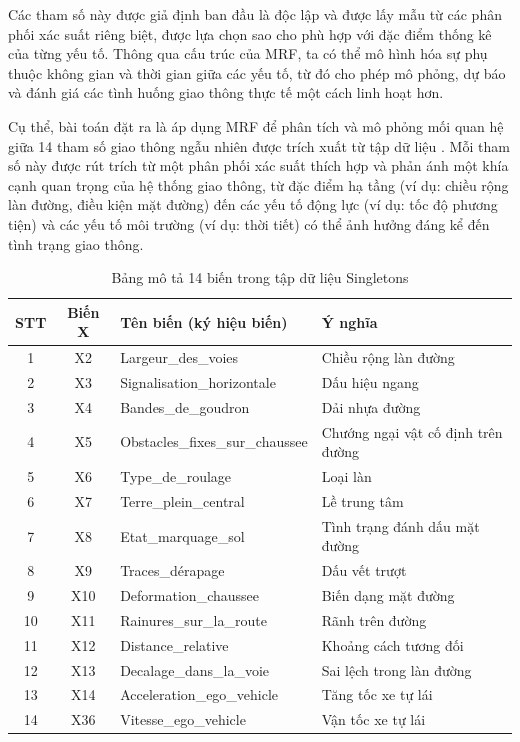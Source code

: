 Các tham số này được giả định ban đầu là độc lập và được lấy mẫu từ các phân phối xác suất riêng biệt, được lựa chọn sao cho phù hợp với đặc điểm thống kê của từng yếu tố. Thông qua cấu trúc của MRF, ta có thể mô hình hóa sự phụ thuộc không gian và thời gian giữa các yếu tố, từ đó cho phép mô phỏng, dự báo và đánh giá các tình huống giao thông thực tế một cách linh hoạt hơn.

Cụ thể, bài toán đặt ra là áp dụng MRF để phân tích và mô phỏng mối quan hệ giữa 14 tham số giao thông ngẫu nhiên được trích xuất từ tập dữ liệu . Mỗi tham số này được rút trích từ một phân phối xác suất thích hợp và phản ánh một khía cạnh quan trọng của hệ thống giao thông, từ đặc điểm hạ tầng (ví dụ: chiều rộng làn đường, điều kiện mặt đường) đến các yếu tố động lực (ví dụ: tốc độ phương tiện) và các yếu tố môi trường (ví dụ: thời tiết) có thể ảnh hưởng đáng kể đến tình trạng giao thông.
\begin{table}[h!]
\centering
\begin{tabular}{|c|c|l|l|}
\hline
\textbf{STT} & \textbf{Biến X} & \textbf{Tên biến (ký hiệu biến)} & \textbf{Ý nghĩa} \\ \hline
1 & X2  & Largeur\_des\_voies              & Chiều rộng làn đường \\ \hline
2 & X3  & Signalisation\_horizontale       & Dấu hiệu ngang \\ \hline
3 & X4  & Bandes\_de\_goudron              & Dải nhựa đường \\ \hline
4 & X5  & Obstacles\_fixes\_sur\_chaussee  & Chướng ngại vật cố định trên đường \\ \hline
5 & X6  & Type\_de\_roulage                & Loại làn \\ \hline
6 & X7  & Terre\_plein\_central            & Lề trung tâm \\ \hline
7 & X8  & Etat\_marquage\_sol              & Tình trạng đánh dấu mặt đường \\ \hline
8 & X9  & Traces\_dérapage                 & Dấu vết trượt \\ \hline
9 & X10 & Deformation\_chaussee            & Biến dạng mặt đường \\ \hline
10 & X11 & Rainures\_sur\_la\_route        & Rãnh trên đường \\ \hline
11 & X12 & Distance\_relative              & Khoảng cách tương đối \\ \hline
12 & X13 & Decalage\_dans\_la\_voie        & Sai lệch trong làn đường \\ \hline
13 & X14 & Acceleration\_ego\_vehicle      & Tăng tốc xe tự lái \\ \hline
14 & X36 & Vitesse\_ego\_vehicle           & Vận tốc xe tự lái \\ \hline
\end{tabular}
\caption{Bảng mô tả 14 biến trong tập dữ liệu Singletons}
\label{tab:singletons_variables}
\end{table}


